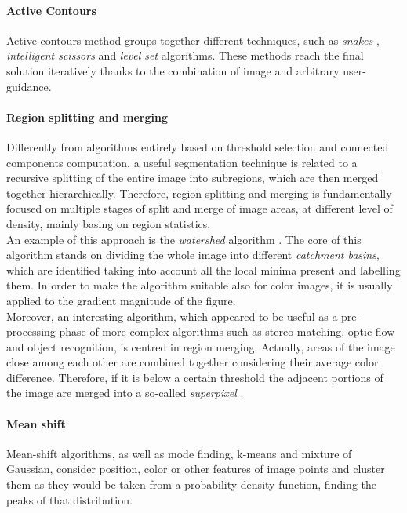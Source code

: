 \paragraph*{Active Contours}

Active contours \cite{balke1998active} method groups together different techniques, such as \textit{snakes} \cite{kass1988snakes}, \textit{intelligent scissors} \cite{mortensen1995intelligent} and \textit{level set} algorithms.
These methods reach the final solution iteratively thanks to the combination of image and arbitrary user-guidance.

\paragraph*{Region splitting and merging}

Differently from algorithms entirely based on threshold selection and connected components computation, a useful segmentation technique is related to a recursive splitting of the entire image into subregions, which are then merged together hierarchically. 
Therefore, region splitting and merging is fundamentally focused on multiple stages of split and merge of image areas, at different level of density, mainly basing on region statistics. \\
An example of this approach is the \textit{watershed} algorithm \cite{vincent1991watersheds}.
The core of this algorithm stands on dividing the whole image into different \textit{catchment basins}, which are identified taking into account all the local minima present and labelling them. 
In order to make the algorithm suitable also for color images, it is usually applied to the gradient magnitude of the figure. \\
Moreover, an interesting algorithm, which appeared to be useful as a pre-processing phase of more complex algorithms such as stereo matching, optic flow and object recognition, is centred in region merging.
Actually, areas of the image close among each other are combined together considering their average color difference. 
Therefore, if it is below a certain threshold the adjacent portions of the image are merged into a so-called \textit{superpixel} \cite{mori2004recovering}.

\paragraph*{Mean shift}

Mean-shift algorithms, as well as mode finding, k-means and mixture of Gaussian, consider position, color or other features of image points and cluster them as they would be taken from a probability density function, finding the peaks of that distribution.\\

